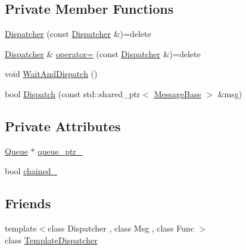 \subsection*{Private Member Functions}
\begin{DoxyCompactItemize}
\item 
\hyperlink{classmessaging_1_1Dispatcher_a6b50ba4fc04d8971bc9ddb3934c8134a}{Dispatcher} (const \hyperlink{classmessaging_1_1Dispatcher}{Dispatcher} \&)=delete
\item 
\hyperlink{classmessaging_1_1Dispatcher}{Dispatcher} \& \hyperlink{classmessaging_1_1Dispatcher_a633a26a5b07d92045164800ba86c01e2}{operator=} (const \hyperlink{classmessaging_1_1Dispatcher}{Dispatcher} \&)=delete
\item 
void \hyperlink{classmessaging_1_1Dispatcher_a0318b520773a5c7a144fa8b9e8a0dd61}{Wait\-And\-Dispatch} ()
\item 
bool \hyperlink{classmessaging_1_1Dispatcher_a4fe4a8aa09f0f97676eef973cceb0ef5}{Dispatch} (const std\-::shared\-\_\-ptr$<$ \hyperlink{structmessaging_1_1MessageBase}{Message\-Base} $>$ \&msg)
\end{DoxyCompactItemize}
\subsection*{Private Attributes}
\begin{DoxyCompactItemize}
\item 
\hyperlink{classmessaging_1_1Queue}{Queue} $\ast$ \hyperlink{classmessaging_1_1Dispatcher_a877e071792b0e42b46c7d32836de0739}{queue\-\_\-ptr\-\_\-}
\item 
bool \hyperlink{classmessaging_1_1Dispatcher_a4db2da2c17f91e2c9b119b60fe4fee0a}{chained\-\_\-}
\end{DoxyCompactItemize}
\subsection*{Friends}
\begin{DoxyCompactItemize}
\item 
{\footnotesize template$<$class Dispatcher , class Msg , class Func $>$ }\\class \hyperlink{classmessaging_1_1Dispatcher_ac52eebabf93ac84bc8eacc5c67e6ca9f}{Template\-Dispatcher}
\end{DoxyCompactItemize}


